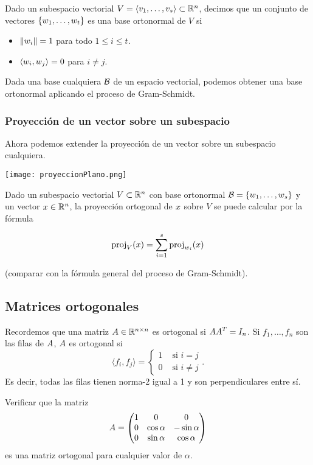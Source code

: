 Dado un subespacio vectorial $V = \langle \vb_1, \dots, \vb_s \rangle \subset \R^n$, decimos que un conjunto de vectores $\{\wb_1, \dots, \wb_t\}$ es una base ortonormal de $V$ si

\begin{itemize}
\item $\|\wb_i\| = 1$ para todo $1 \le i \le t$.
\item $\langle \wb_i, \wb_j \rangle = 0$ para $i \neq j$.
\end{itemize}

Dada una base cualquiera $\mathcal B$ de un espacio vectorial, podemos obtener una base ortonormal aplicando el proceso de Gram-Schmidt.

\subsubsection{Proyección de un vector sobre un subespacio}

Ahora podemos extender la proyección de un vector sobre un subespacio cualquiera.

\texttt{[image: proyeccionPlano.png]}

Dado un subespacio vectorial $V \subset \mathbb R^n$ con base ortonormal $\B = \{\wb_1, \dots, \wb_s\}$ y un vector $\xb \in \R^n$, la proyección ortogonal de $\xb$ sobre $V$ se puede calcular por la fórmula

$$
\proj_V(\xb) = \sum_{i = 1}^{s} \proj_{\wb_i}(\xb)
$$

(comparar con la fórmula general del proceso de Gram-Schmidt).

\subsection{Matrices ortogonales}

Recordemos que una matriz $\Ab \in \mathbb{R}^{n \times n}$ es ortogonal si $\Ab \Ab^T = I_n$. Si $f_1, \dots, f_n$ son las filas de $\Ab$, $\Ab$ es ortogonal si
$$
\langle f_i , f_j\rangle =
\begin{cases}
1 & \text{ si } i = j \\
0 & \text{ si } i \ne j
\end{cases}.
$$
Es decir, todas las filas tienen norma-2 igual a 1 y son perpendiculares entre sí.

\begin{ejercicio}Verificar que la matriz
$$
\Ab = \begin{pmatrix}
1 & 0 & 0 \\ 0 & \cos \alpha & -\sin \alpha \\ 0 & \sin \alpha & \cos \alpha
\end{pmatrix}
$$
es una matriz ortogonal para cualquier valor de $\alpha$.
\end{ejercicio}

